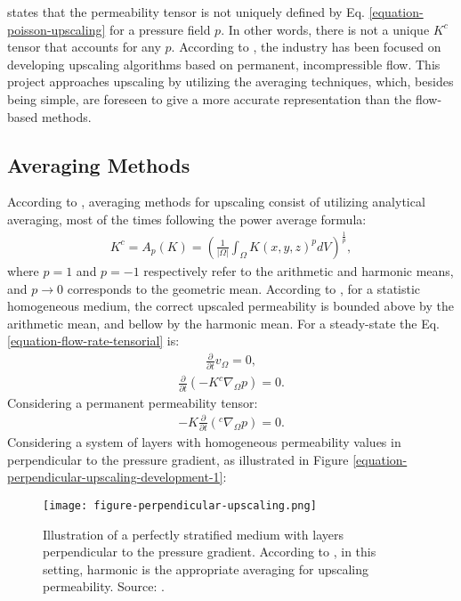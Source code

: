 \cite{Lie2015} states that the permeability tensor is not uniquely defined by Eq. \ref{equation-poisson-upscaling} for a pressure field $p$.
%
In other words, there is not a unique $K^c$ tensor that accounts for any $p$.
%
According to \cite{Nunna2015}, the industry has been focused on developing upscaling algorithms based on permanent, incompressible flow. 
%
This project approaches upscaling by utilizing the averaging techniques, which, besides being simple, are foreseen to give a more accurate representation than the flow-based methods.

\subsection{Averaging Methods}

According to \cite{Lie2015}, averaging methods for upscaling consist of utilizing analytical averaging, most of the times following the power average formula:
%
%
\begin{align}
	K^c=A_p(K)=\left(\frac{1}{|\Omega|}\int_{\Omega}K(x,y,z)^pdV\right)^{\frac{1}{p}},
\end{align}
%
where $p=1$ and $p=-1$ respectively refer to the arithmetic and harmonic means, and $p \rightarrow 0$ corresponds to the geometric mean. 
%
According to \cite{Wiener1912}, for a statistic homogeneous medium, the correct upscaled permeability is bounded above by the arithmetic mean, and bellow by the harmonic mean. 
%
For a steady-state the Eq. \ref{equation-flow-rate-tensorial} is:
%
\begin{align}
	\label{equation-steady-state-upscaling}
	\frac{\partial}{\partial t}v_\Omega= 0,
\end{align}
%
\begin{align}
	\frac{\partial}{\partial t} \left(-K^c\nabla_\Omega p\right)= 0.
\end{align}
%
Considering a permanent permeability tensor:
%
\begin{align}
	\label{equation-darcys-law-upscaling}
	-K\frac{\partial}{\partial t} \left(^c\nabla_\Omega p\right)= 0.
\end{align}
%
Considering a system of layers with homogeneous permeability values in perpendicular to the pressure gradient, as illustrated in Figure 
\ref{equation-perpendicular-upscaling-development-1}:
%
\begin{figure}
	\centering
	\texttt{[image: figure-perpendicular-upscaling.png]}
	\caption{Illustration of a perfectly stratified medium with layers perpendicular to the pressure gradient. According to \cite{Lie2015}, in this setting, harmonic is the appropriate averaging for upscaling permeability. Source: \cite{Lie2015}.}
	\label{figure-perpendicular-upscaling}
\end{figure}
